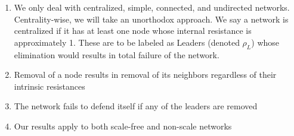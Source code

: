 \documentclass{article}
\begin{document}
	\begin{enumerate}
		\item {We only deal with centralized, simple, connected, and undirected networks.}
		Centrality-wise, we will take an unorthodox approach. We say a network is centralized if it has at least one node whose internal resistance is approximately 1. These are to be labeled as Leaders (denoted $\rho_L$) whose elimination would results in total failure of the network.
		\item {Removal of a node results in removal of its neighbors regardless of their intrinsic resistances}
		\item {The network fails to defend itself if any of the leaders are removed}
		\item {Our results apply to both scale-free and non-scale networks}
	\end{enumerate}
	
	
	\pagebreak
	
	
\end{document}
